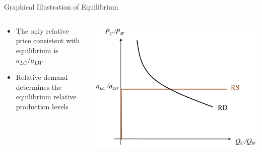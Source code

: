 \documentclass[10pt,hyperref={CJKbookmarks=true},xcolor=dvipsnames,aspectratio=169]{beamer}
\begin{document}
\begin{frame}{Graphical Illustration of Equilibrium}


\begin{columns}[onlytextwidth]
\begin{column}{0.4\textwidth}
\begin{itemize}
\item The only relative price consistent with equilibrium is $a_{LC}/a_{LW}$
\item Relative demand determines the equilibrium relative production levels
\end{itemize}

\end{column}
\begin{column}{0.6\textwidth}
\includegraphics[width=\columnwidth]{fig/ricardo/lec3-06}
\end{column}
\end{columns}

\end{frame}
\end{document}
